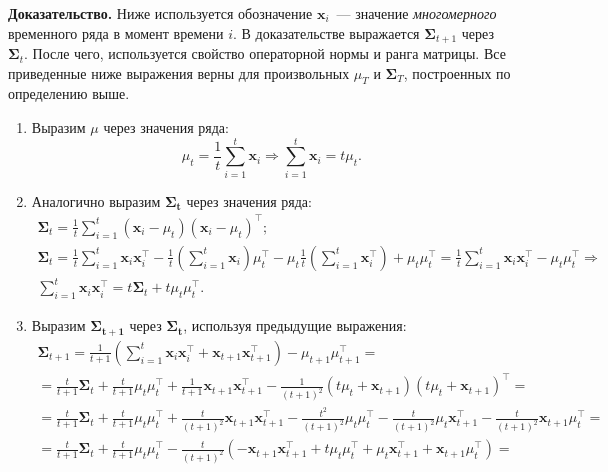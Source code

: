 \documentclass{article}
\begin{document}
\textbf{Доказательство.}
Ниже используется обозначение $\mathbf{x}_i$~--- значение \textit{многомерного} временного ряда в момент времени $i$. В доказательстве выражается $\mathbf{\Sigma}_{t+1}$ через $\mathbf{\Sigma}_t$. После чего, используется свойство операторной нормы и ранга матрицы. Все приведенные ниже выражения верны для произвольных $\mu_T$ и $\mathbf{\Sigma}_T$, построенных по определению выше.
\begin{enumerate}
	\item Выразим $\mu$ через значения ряда: \[\mu_t = \frac{1}{t} \sum_{i=1}^{t} \mathbf{x}_i \Rightarrow \sum_{i=1}^{t} \mathbf{x}_i = t \mu_t.\]
	\item Аналогично выразим $\mathbf{\Sigma_t}$ через значения ряда:
		\begin{gather*}
		\mathbf{\Sigma}_t = \frac{1}{t} \sum_{i=1}^{t} (\mathbf{x}_i-\mu_t)(\mathbf{x}_i-\mu_t)^\intercal;\\
		\mathbf{\Sigma}_t = \frac{1}{t} \sum_{i=1}^{t} \mathbf{x}_i \mathbf{x}_i^\intercal - \frac{1}{t} \left( \sum_{i=1}^{t} \mathbf{x}_i\right) \mu_t^\intercal - \mu_t \frac{1}{t} \left( \sum_{i=1}^{t} \mathbf{x}_i^\intercal\right) + \mu_t \mu_t^\intercal = \frac{1}{t} \sum_{i=1}^{t} \mathbf{x}_i \mathbf{x}_i^\intercal - \mu_t \mu_t^\intercal \Rightarrow\\
		\sum_{i=1}^{t} \mathbf{x}_i \mathbf{x}_i^\intercal = t \mathbf{\Sigma}_t + t \mu_t \mu_t^\intercal.
		\end{gather*}
	\item Выразим $\mathbf{\Sigma_{t+1}}$ через $\mathbf{\Sigma_t}$, используя предыдущие выражения:
	\begin{gather*}
		\mathbf{\Sigma}_{t+1} = \frac{1}{t+1} \left(\sum_{i=1}^{t} \mathbf{x}_i \mathbf{x}_i^\intercal + \mathbf{x}_{t+1} \mathbf{x}_{t+1}^\intercal \right) - \mu_{t+1} \mu_{t+1}^\intercal = \\
		= \frac{t}{t+1}\mathbf{\Sigma}_t + \frac{t}{t+1}\mu_{t} \mu_{t}^\intercal + \frac{1}{t+1} \mathbf{x}_{t+1} \mathbf{x}_{t+1}^\intercal - \frac{1}{(t+1)^2} (t \mu_t + \mathbf{x}_{t+1})(t \mu_t + \mathbf{x}_{t+1})^\intercal =\\
		= \frac{t}{t+1}\mathbf{\Sigma}_t + \frac{t}{t+1}\mu_{t} \mu_{t}^\intercal + \frac{t}{(t+1)^2} \mathbf{x}_{t+1} \mathbf{x}_{t+1}^\intercal - \frac{t^2}{(t+1)^2}\mu_{t} \mu_{t}^\intercal - \frac{t}{(t+1)^2}\mu_{t} \mathbf{x}_{t+1}^\intercal - \frac{t}{(t+1)^2}\mathbf{x}_{t+1} \mu_{t}^\intercal =\\
		= \frac{t}{t+1}\mathbf{\Sigma}_t + \frac{t}{t+1}\mu_{t} \mu_{t}^\intercal - \frac{t}{(t+1)^2} \left( -\mathbf{x}_{t+1} \mathbf{x}_{t+1}^\intercal + t\mu_{t} \mu_{t}^\intercal + \mu_{t} \mathbf{x}_{t+1}^\intercal + \mathbf{x}_{t+1} \mu_{t}^\intercal \right) =\\

\end{gather*}
\end{enumerate}
\end{document}
